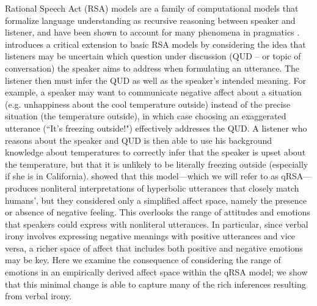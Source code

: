 \documentclass[10pt,letterpaper]{article}
\begin{document}
Rational Speech Act (RSA) models are a family of computational models that formalize language understanding as recursive reasoning between speaker and listener, and have been shown to account for many phenomena in pragmatics \cite{frank2012predicting, goodman2013knowledge}.  introduces a critical extension to basic RSA models by considering the idea that listeners may be uncertain which question under discussion (QUD -- or topic of conversation) the speaker aims to address when formulating an utterance. The listener then must infer the QUD as well as the speaker's intended meaning. For example, a speaker may want to communicate negative affect about a situation (e.g. unhappiness about the cool temperature outside) instead of the precise situation (the temperature outside), in which case choosing an exaggerated utterance (``It's freezing outside!") effectively addresses the QUD. A listener who reasons about the speaker and QUD is then able to use his background knowledge about temperatures to correctly infer that the speaker is upset about the temperature, but that it is unlikely to be literally freezing outside (especially if she is in California). 
 showed that this model---which we will refer to as qRSA---produces nonliteral interpretations of hyperbolic utterances that closely match humans',  but they considered only a simplified affect space, namely the presence or absence of negative feeling. This overlooks the range of attitudes and emotions that speakers could express with nonliteral utterances. In particular, since verbal irony involves expressing negative meanings with positive utterances and vice versa, a richer space of affect that includes both positive and negative emotions may be key. Here we examine the consequence of considering the range of emotions in an empirically derived affect space within the qRSA model; we show that this minimal change is able to capture many of the rich inferences resulting from verbal irony.



\end{document}

